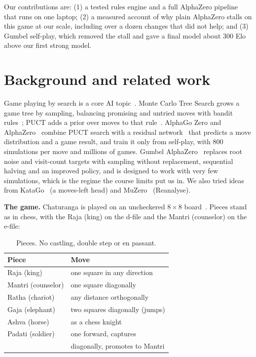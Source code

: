 \documentclass[11pt,a4paper,twocolumn]{article}
\begin{document}
Our contributions are: (1) a tested rules engine and a full AlphaZero pipeline that runs on
one laptop; (2) a measured account of why plain AlphaZero stalls on this game at our scale,
including over a dozen changes that did not help; and (3) Gumbel self-play, which removed the
stall and gave a final model about 300 Elo above our first strong model.

\section{Background and related work}
Game playing by search is a core AI topic~\cite{russell2021aima}. Monte Carlo Tree Search
grows a game tree by sampling, balancing promising and untried moves with bandit
rules~\cite{kocsis2006bandit}; PUCT adds a prior over moves to that
rule~\cite{rosin2011puct}. AlphaGo Zero and AlphaZero~\cite{silver2017go,silver2018alphazero}
combine PUCT search with a residual network~\cite{he2016resnet} that predicts a move
distribution and a game result, and train it only from self-play, with 800 simulations per
move and millions of games. Gumbel AlphaZero~\cite{danihelka2022gumbel} replaces root noise
and visit-count targets with sampling without replacement, sequential halving and an
improved policy, and is designed to work with very few simulations, which is the regime the
course limits put us in. We also tried ideas from KataGo~\cite{wu2019katago} (a moves-left
head) and MuZero~\cite{schrittwieser2020muzero} (Reanalyse).

\textbf{The game.} Chaturanga is played on an uncheckered $8\times8$
board~\cite{murray1913history}. Pieces stand as in chess, with the Raja (king) on the
d-file and the Mantri (counselor) on the e-file:

\begin{table}[h]
\centering
\small
\begin{tabular}{@{}ll@{}}
\toprule
Piece & Move \\
\midrule
Raja (king) & one square in any direction \\
Mantri (counselor) & one square diagonally \\
Ratha (chariot) & any distance orthogonally \\
Gaja (elephant) & two squares diagonally (jumps) \\
Ashva (horse) & as a chess knight \\
Padati (soldier) & one forward, captures \\
 & diagonally, promotes to Mantri \\
\bottomrule
\end{tabular}
\caption{Pieces. No castling, double step or en passant.}
\label{tab:pieces}
\end{table}
\end{document}
